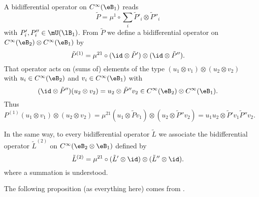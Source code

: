 A bidifferential operator on $ C^{\infty}(\eB_1)$ reads
\begin{equation}
	\tilde P=\mu^1\circ\sum_i \tilde P'_i\otimes \tilde P''_i
\end{equation}
with $P_i',P''_i\in\mU(\lB_1)$. From $\tilde P$ we define a bidifferential operator on $ C^{\infty}(\eB_2)\otimes C^{\infty}(\eB_1)$ by
\begin{equation}
	\tilde P^{(1)}=\mu^{21}\circ(\id\otimes \tilde P')\otimes(\id\otimes \tilde P'').
\end{equation}
That operator acts on (sums of) elements of the type $(u_1\otimes v_1)\otimes(u_2\otimes v_2)$ with $u_i\in C^{\infty}(\eB_2)$ and $v_i\in C^{\infty}(\eB_1)$ with
\begin{equation}
	(\id\otimes \tilde P'')(u_2\otimes v_2)=u_2\otimes \tilde P''v_2\in C^{\infty}(\eB_2)\otimes C^{\infty}(\eB_1).
\end{equation}
Thus
\begin{equation}
	P^{(1)}(u_1\otimes v_1)\otimes(u_2\otimes v_2)=\mu^{21}(u_1\otimes \tilde Pv_1)\otimes(u_2\otimes \tilde P''v_2)=u_1u_2\otimes \tilde P'v_1\tilde P''v_2.
\end{equation}

In the same way, to every bidifferential operator $\tilde L$ we associate the bidifferential operator $\tilde L^{(2)}$ on $ C^{\infty}(\eB_2\otimes\eB_1)$ defined by
\begin{equation}
	\tilde L^{(2)}=\mu^{21}\circ(\tilde L'\otimes\id)\otimes(\tilde L''\otimes\id).
\end{equation}
where a summation is understood.

The following proposition (as everything here) comes from \cite{QuantifKhalerian}.

